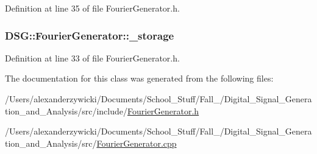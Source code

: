 Definition at line 35 of file Fourier\+Generator.\+h.

\hypertarget{classDSG_1_1FourierGenerator_a6b7f2439b26914cc9df6b6975a2cedac}{
\subsubsection[{\+\_\+storage}]{ D\+S\+G\+::\+Fourier\+Generator\+::\+\_\+storage\hspace{0.3cm}{\ttfamily [protected]}}}\label{classDSG_1_1FourierGenerator_a6b7f2439b26914cc9df6b6975a2cedac}


Definition at line 33 of file Fourier\+Generator.\+h.



The documentation for this class was generated from the following files\+:\begin{DoxyCompactItemize}
\item 
/\+Users/alexanderzywicki/\+Documents/\+School\+\_\+\+Stuff/\+Fall\+\_/\+Digital\+\_\+\+Signal\+\_\+\+Generation\+\_\+and\+\_\+\+Analysis/src/include/\hyperlink{FourierGenerator_8h}{Fourier\+Generator.\+h}\item 
/\+Users/alexanderzywicki/\+Documents/\+School\+\_\+\+Stuff/\+Fall\+\_/\+Digital\+\_\+\+Signal\+\_\+\+Generation\+\_\+and\+\_\+\+Analysis/src/\hyperlink{FourierGenerator_8cpp}{Fourier\+Generator.\+cpp}\end{DoxyCompactItemize}
